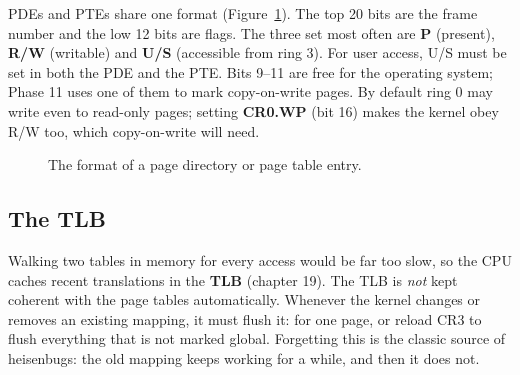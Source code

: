 \documentclass[11pt,a4paper]{article}
\begin{document}
PDEs and PTEs share one format (Figure~\ref{fig:pte}). The top 20 bits are the frame number and the low 12 bits are
flags. The three set most often are \textbf{P} (present), \textbf{R/W} (writable) and \textbf{U/S} (accessible
from ring 3). For user access, U/S must be set in both the PDE and the PTE. Bits 9--11 are free for the operating
system; Phase 11 uses one of them to mark copy-on-write pages. By default ring 0 may write even to read-only pages;
setting \textbf{CR0.WP} (bit 16) makes the kernel obey R/W too, which copy-on-write will need.

\begin{figure}[htbp]
\centering
{}
\caption{The format of a page directory or page table entry.}
\label{fig:pte}
\end{figure}

\subsection{The TLB}

Walking two tables in memory for every access would be far too slow, so the CPU caches recent translations in the
\textbf{TLB} (\OSTEP chapter 19). The TLB is \emph{not} kept coherent with the page tables automatically. Whenever the kernel
changes or removes an existing mapping, it must flush it:  for one page, or reload CR3 to flush
everything that is not marked global. Forgetting this is the classic source of heisenbugs: the old mapping keeps
working for a while, and then it does not.
\end{document}
